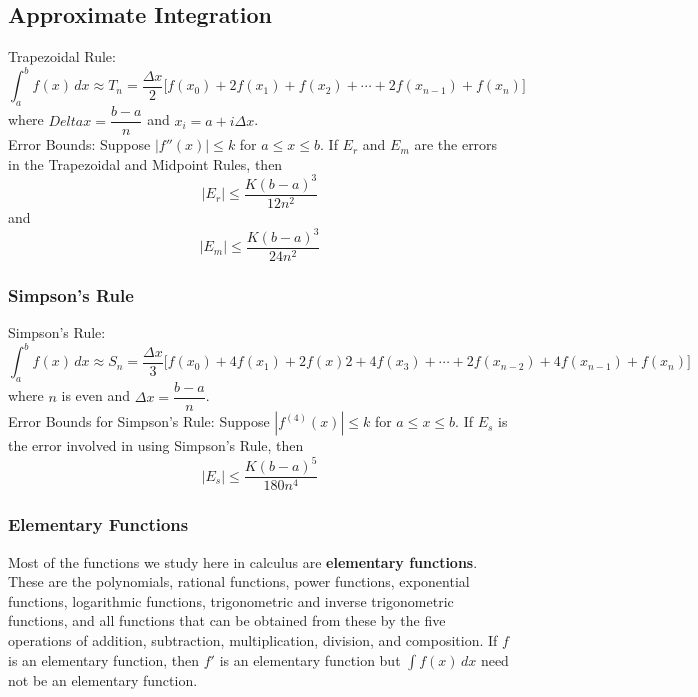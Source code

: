 \subsection{Approximate Integration}

Trapezoidal Rule:
\[\int_a^b f(x)\,dx\approx T_n
=\frac{\Delta x}{2}\big[f(x_0)+2f(x_1)+f(x_2)+\cdots+2f(x_{n-1})+f(x_n)\big]\]
where \(Delta x=\dfrac{b-a}{n}\) and \(x_i=a+i\Delta x\). \\
Error Bounds: Suppose \(|f''(x)|\leq k\) for \(a\leq x\leq b\).
If \(E_r\) and \(E_m\) are the errors in the Trapezoidal and Midpoint Rules,
then
\[|E_r|\leq\frac{K(b-a)^3}{12n^2}\]
and
\[|E_m|\leq\frac{K(b-a)^3}{24n^2}\]

\subsubsection*{Simpson's Rule}
Simpson's Rule:
\[\int_a^b f(x)\,dx\approx S_n
=\frac{\Delta x}{3}\big[f(x_0)+4f(x_1)+2f(x)2+4f(x_3)+\cdots+2f(x_{n-2})
+4f(x_{n-1})+f(x_n)\big]\]
where \(n\) is even and \(\Delta x=\dfrac{b-a}{n}\). \\
Error Bounds for Simpson's Rule: Suppose \(|f^{(4)}(x)|\leq k\) for
\(a\leq x\leq b\).
If \(E_s\) is the error involved in using Simpson's Rule, then
\[|E_s|\leq\frac{K(b-a)^5}{180n^4}\]

\subsubsection*{Elementary Functions}
Most of the functions we study here in calculus are
\textbf{elementary functions}.
These are the polynomials, rational functions, power functions, exponential
functions, logarithmic functions, trigonometric and inverse trigonometric
functions, and all functions that can be obtained from these by the five
operations of addition, subtraction, multiplication, division, and
composition.
If \(f\) is an elementary function, then \(f'\) is an elementary function but
\(\displaystyle{\int f(x)\,dx}\) need not be an elementary function.
